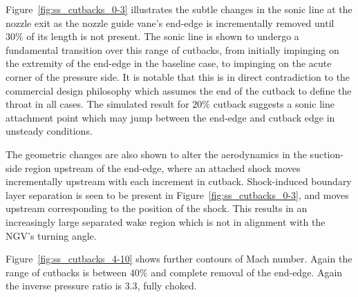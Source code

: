 \documentclass[a4paper, 11pt, oneside]{report}
\begin{document}
Figure~\ref{fig:ss_cutbacks_0-3} illustrates the subtle changes in the sonic line at the nozzle exit as the nozzle guide vane's end-edge is incrementally removed until $30\%$ of its length is not present. The sonic line is shown to undergo a fundamental transition over this range of cutbacks, from initially impinging on the extremity of the end-edge in the baseline case, to impinging on the acute corner of the pressure side. It is notable that this is in direct contradiction to the commercial design philosophy which assumes the end of the cutback to define the throat in all cases. The simulated result for $20\%$ cutback suggests a sonic line attachment point which may jump between the end-edge and cutback edge in unsteady conditions.

The geometric changes are also shown to alter the aerodynamics in the suction-side region upstream of the end-edge, where an attached shock moves incrementally upstream with each increment in cutback. Shock-induced boundary layer separation is seen to be present in Figure~\ref{fig:ss_cutbacks_0-3}, and moves upstream corresponding to the position of the shock. This results in an increasingly large separated wake region which is not in alignment with the NGV's turning angle.

\newpage
Figure~\ref{fig:ss_cutbacks_4-10} shows further contours of Mach number. Again the range of cutbacks is between $40\%$ and complete removal of the end-edge. Again the inverse pressure ratio is $3.3$, fully choked.
\end{document}
